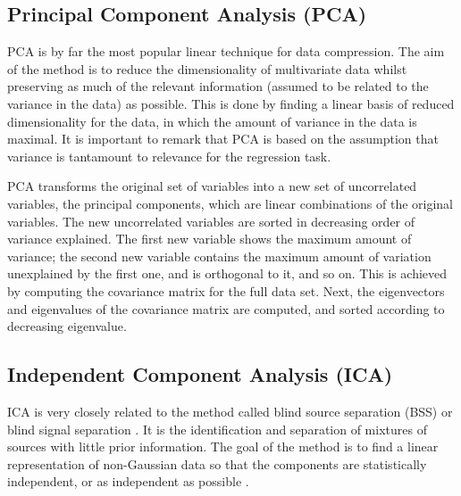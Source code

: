 \documentclass[a4paper,fleqn,usenatbib]{mnras}
\begin{document}

\subsection{Principal Component Analysis (PCA)}

PCA \citep{hotelling:33,pearson:01} is by far the most popular linear 
technique for data compression. The aim of the method is to reduce the
dimensionality of multivariate data whilst preserving as much of the
relevant information (assumed to be related to the variance in the
data) as possible. This is done by finding a linear basis of reduced
dimensionality for the data, in which the amount of variance in the
data is maximal. It is important to remark that PCA is based on the
assumption that variance is tantamount to relevance for the regression
task.

PCA transforms the original set of variables into a new set of
uncorrelated variables, the principal components, which are linear
combinations of the original variables. The new uncorrelated variables
are sorted in decreasing order of variance explained. The first
new variable shows the maximum amount of variance; the second
new variable contains the maximum amount of variation unexplained by
the first one, and is orthogonal to it, and so on.  This is
achieved by computing the covariance matrix for the full data
set. Next, the eigenvectors and eigenvalues of the covariance matrix
are computed, and sorted according to decreasing eigenvalue.

\subsection{Independent Component Analysis (ICA)}

ICA \citep{comon:94} is very closely related to the method called blind 
source separation (BSS) or blind signal separation \citep{jutten:91}. 
It is the identification and separation of mixtures of sources with 
little prior information. The goal of the method is to find a linear 
representation of non-Gaussian data so that the components are 
statistically independent, or as independent as possible \citep{hyvarinen:00}.
\end{document}

